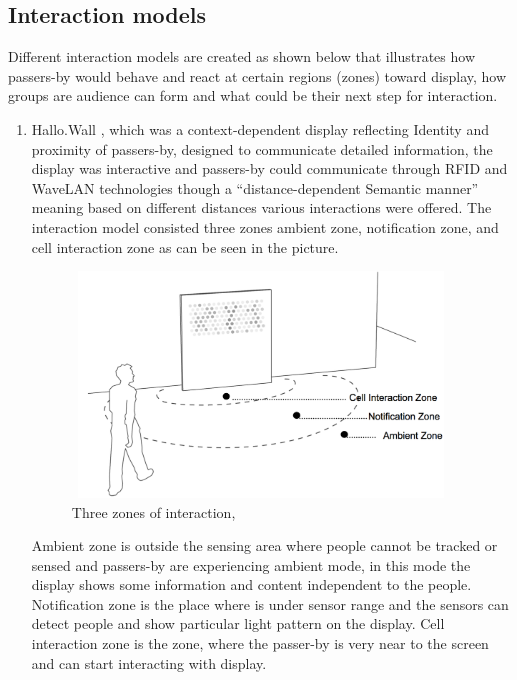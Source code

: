 \subsection{Interaction models}
Different interaction models are created as shown below that illustrates how passers-by would behave and react at certain regions (zones) toward display, how groups are audience can form and what could be their next step for interaction. 


\begin{enumerate}


\item Hallo.Wall \cite{hello_wall, hellow_wall_2}, which was a context-dependent display reflecting Identity and proximity of passers-by, designed to communicate detailed information, the display was interactive and passers-by could communicate through RFID and WaveLAN technologies though a “distance-dependent Semantic manner” meaning based on different distances various interactions were offered. The interaction model consisted three zones ambient zone, notification zone, and cell interaction zone as can be seen in the picture. 

\begin{figure}[H]
\centering
\includegraphics[width=100mm,height=60mm]{Figures/2/hello_wall}
\caption{Three zones of interaction, \cite{hellow_wall_2}}
\label{fig:threezoneofinteraction}
\end{figure}

Ambient zone is outside the sensing area where people cannot be tracked or sensed and passers-by are experiencing ambient mode, in this mode the display shows some information and content independent to the people. Notification zone is the place where is under sensor range and the sensors can detect people and show particular light pattern on the display. Cell interaction zone is the zone, where the passer-by is very near to the screen and can start interacting with display. 



\end{enumerate}

